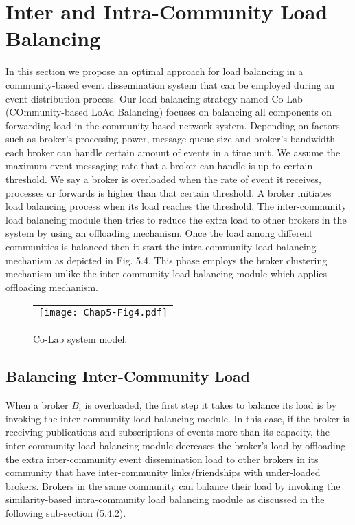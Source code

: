 \section{Inter and Intra-Community Load Balancing}\label{Chap5_04}
In this section we propose an optimal approach for load balancing in a community-based event dissemination system that can be employed during an event distribution process. Our load balancing strategy named Co-Lab (COmmunity-based LoAd Balancing) focuses on balancing all components on forwarding load in the community-based network system. Depending on factors such as broker's processing power, message queue size and broker's bandwidth each broker can handle certain amount of events in a time unit. We assume the maximum event messaging rate that a broker can handle is up to certain threshold. We say a broker is overloaded when the rate of event it receives, processes or forwards is higher than that certain threshold. A broker initiates load balancing process when its load reaches the threshold. The inter-community load balancing module then tries to reduce the extra load to other brokers in the system by using an offloading mechanism. Once the load among different communities is balanced then it start the intra-community load balancing mechanism as depicted in Fig. 5.4.  This phase employs the broker clustering mechanism unlike the inter-community load balancing module which applies offloading mechanism.

\begin{figure}[t]
\begin{center}
  \begin{tabular}{c}
  \texttt{[image: Chap5-Fig4.pdf]}
  \end{tabular}
  \caption{Co-Lab system model.}
\end{center}
\end{figure}

\subsection{Balancing Inter-Community Load}\label{Chap5_04_01}
When a broker $B_i$ is overloaded, the first step it takes to balance its load is by invoking the inter-community load balancing module. In this case, if the broker is receiving publications and subscriptions of events more than its capacity, the inter-community load balancing module decreases the broker's load by offloading the extra inter-community event dissemination load to other brokers in its community that have inter-community links/friendships with under-loaded brokers. Brokers in the same community can balance their load by invoking the similarity-based intra-community load balancing module as discussed in the following sub-section (5.4.2).

